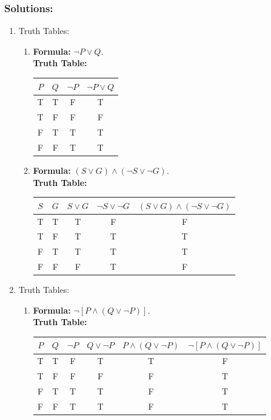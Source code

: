 \subsubsection{Solutions:}
\begin{enumerate}
\item Truth Tables:
  \begin{enumerate}
  \item \textbf{Formula:} $\neg P \lor Q$. \\
    \textbf{Truth Table:}
    \begin{center}
      \begin{tabular}{cccc}
        $P$ & $Q$ & $\neg P$ & $\neg P \lor Q$ \\
        \midrule
        T & T & F & T \\
        T & F & F & F \\
        F & T & T & T \\
        F & F & T & T
      \end{tabular}
    \end{center}
    
  \item \textbf{Formula:} $(S \lor G) \land (\neg S \lor \neg G)$. \\
    \textbf{Truth Table:}
    \begin{center}
      \begin{tabular}{ccccc}
        $S$ & $G$ & $S \lor G$ & $\neg S \lor \neg G$ & $(S \lor G) \land (\neg S \lor \neg G)$ \\
        \midrule
        T & T & T & F & F \\
        T & F & T & T & T \\
        F & T & T & T & T \\
        F & F & F & T & F 
      \end{tabular}
    \end{center}
  \end{enumerate}

\item Truth Tables:
  \begin{enumerate}
  \item \textbf{Formula:} $\neg [P \land (Q \lor \neg P)]$. \\
    \textbf{Truth Table:}
    \begin{center}
      \begin{tabular}{cccccc}
        $P$ & $Q$ & $\neg P$ & $Q \lor \neg P$ & $P \land (Q \lor \neg P)$ & $\neg[P \land (Q \lor \neg P)]$ \\
        \midrule
        T & T & F & T & T & F \\ 
        T & F & F & F & F & T \\
        F & T & T & T & F & T \\ 
        F & F & T & T & F & T 
      \end{tabular}
    \end{center}


\end{enumerate}
\end{enumerate}

